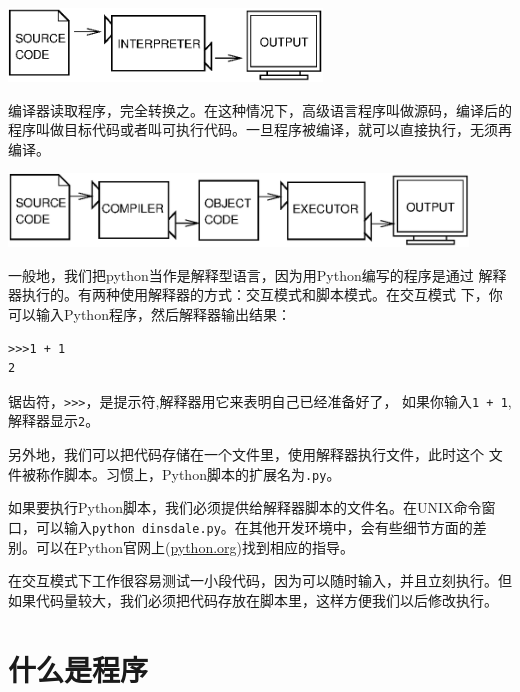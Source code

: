 \beforefig
\centerline{\includegraphics[height=0.77in]{figs/interpret.eps}}
\afterfig


编译器读取程序，完全转换之。在这种情况下，高级语言程序叫做源码，编译后的程序叫做目标代码或者叫可执行代码。一旦程序被编译，就可以直接执行，无须再编译。

\beforefig
\centerline{\includegraphics[height=0.77in]{figs/compile.eps}}
\afterfig

一般地，我们把python当作是解释型语言，因为用Python编写的程序是通过
解释器执行的。有两种使用解释器的方式：交互模式和脚本模式。在交互模式
下，你可以输入Python程序，然后解释器输出结果：


\beforeverb
\begin{verbatim}    
>>>1 + 1
2
\end{verbatim} %
\afterverb

锯齿符，{\tt >>>}，是提示符,解释器用它来表明自己已经准备好了，
如果你输入{\tt 1 + 1},解释器显示{\tt 2}。\\


另外地，我们可以把代码存储在一个文件里，使用解释器执行文件，此时这个
文件被称作脚本。习惯上，Python脚本的扩展名为{\tt .py}。


如果要执行Python脚本，我们必须提供给解释器脚本的文件名。在UNIX命令窗口，可以输入{\tt python dinsdale.py}。在其他开发环境中，会有些细节方面的差别。可以在Python官网上(\url{python.org})找到相应的指导。


在交互模式下工作很容易测试一小段代码，因为可以随时输入，并且立刻执行。但如果代码量较大，我们必须把代码存放在脚本里，这样方便我们以后修改执行。 

\section{什么是程序}

